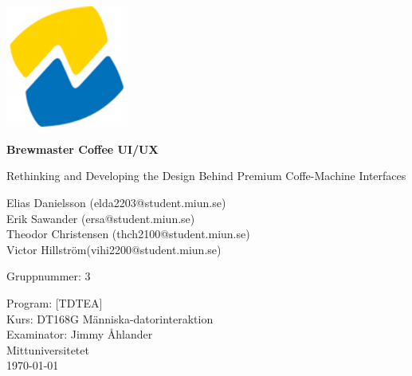 \begin{titlepage}
    \centering

    \vspace*{2cm}

    \includegraphics[width=0.3\textwidth]{miun_logo.png}

    \vspace{1cm}

    {\huge\bfseries Brewmaster Coffee UI/UX\par}
    \vspace{0.5cm}
    {\large Rethinking and Developing the Design Behind Premium Coffe-Machine Interfaces \par}

    \vspace{2cm}

    {\Large
    Elias Danielsson (elda2203@student.miun.se)\\
    Erik Sawander (ersa@student.miun.se)\\
    Theodor Christensen (thch2100@student.miun.se)\\
    Victor Hillström(vihi2200@student.miun.se)\\
    }

    \vspace{1cm}

    {\large Gruppnummer: 3\par}

    \vfill

    {\large
    Program: [TDTEA]\\
    Kurs: DT168G Människa-datorinteraktion\\
    Examinator: Jimmy Åhlander\\
    Mittuniversitetet\\
    \today
    }

\end{titlepage}
